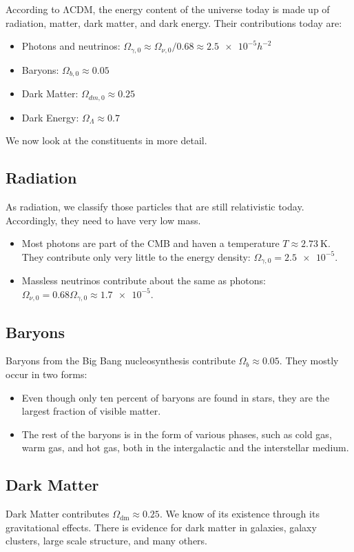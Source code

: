 According to ΛCDM, the energy content of the universe today is made up of radiation, matter, dark matter, and dark energy. Their contributions today are:
\begin{itemize}
	\item Photons and neutrinos: $\Omega_{\gamma,0} \approx \Omega_{\nu,0}/0.68 \approx \num{2.5e-5} h^{-2}$
	\item Baryons:  $\Omega_{b,0} \approx 0.05$
	\item Dark Matter: $\Omega_{dm,0} \approx 0.25$
	\item Dark Energy: $\Omega_\Lambda \approx 0.7$
\end{itemize}
We now look at the constituents in more detail.

\subsection*{Radiation}

As radiation, we classify those particles that are still relativistic today. Accordingly, they need to have very low mass.
\begin{itemize}
	\item Most photons are part of the CMB and haven a temperature $T\approx \SI{2.73}{\kelvin}$. They contribute only very little to the energy density: $\Omega_{\gamma,0} = \num{2.5e-5}$.
	\item Massless neutrinos contribute about the same as photons: $\Omega_{\nu,0} = 0.68 \Omega_{\gamma,0} \approx \num{1.7e-5}$.
\end{itemize}

\subsection*{Baryons}
Baryons from the Big Bang nucleosynthesis contribute $\Omega_b \approx 0.05$. They mostly occur in two forms:
\begin{itemize}
	\item Even though only ten percent of baryons are found in stars, they are the largest fraction of visible matter.
	\item The rest of the baryons is in the form of various phases, such as cold gas, warm gas, and hot gas, both in the intergalactic and the interstellar medium.
\end{itemize}

\subsection*{Dark Matter}
Dark Matter contributes $\Omega_\text{dm} \approx 0.25$. We know of its existence through its gravitational effects. There is evidence for dark matter in galaxies, galaxy clusters, large scale structure, and many others.

